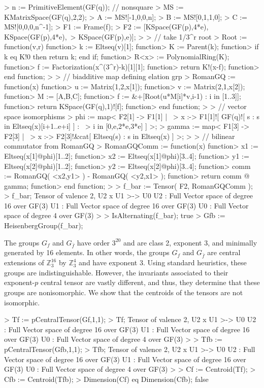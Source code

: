 \begin{example}
\begin{code}
> n := PrimitiveElement(GF(q)); // nonsquare
> MS := KMatrixSpace(GF(q),2,2);
> A := MS![-1,0,0,n];
> B := MS![0,1,1,0];
> C := MS![0,0,0,n^-1];
> F1 := Frame(f);
> F2 := [KSpace(GF(p),4*e), KSpace(GF(p),4*e),\
>   KSpace(GF(p),e)];
> 
> // take 1/3^r root
> Root := function(v,r) 
function>   k := Eltseq(v)[1];
function>   K := Parent(k);
function>   if k eq K!0 then return k; end if;
function>   R<x> := PolynomialRing(K);
function>   f := Factorization(x^(3^r)-k)[1][1];
function>   return K!(x-f);
function> end function;
> 
> // biadditive map defining elation grp
> RomanGQ := function(x) 
function>   u := Matrix(1,2,x[1]);
function>   v := Matrix(2,1,x[2]);
function>   M := [A,B,C];
function>   f := &+[Root(u*M[i]*v,i-1) : i in [1..3]];
function>   return KSpace(GF(q),1)![f];
function> end function;
> 
> // vector space isomorphisms
> phi := map< F2[1] -> F1[1] | \
>   x :-> F1[1]![ GF(q)![ s : s in Eltseq(x)[i+1..e+i] ] : \
>     i in [0,e,2*e,3*e] ] >;
> gamma := map< F1[3] -> F2[3] | \
>   x :-> F2[3]!&cat[ Eltseq(s) : s in Eltseq(x) ] >;
> 
> // bilinear commutator from RomanGQ
> RomanGQComm := function(x)
function>   x1 := Eltseq(x[1]@phi)[1..2];
function>   x2 := Eltseq(x[1]@phi)[3..4];
function>   y1 := Eltseq(x[2]@phi)[1..2];
function>   y2 := Eltseq(x[2]@phi)[3..4];
function>   comm := RomanGQ( <x2,y1> ) - RomanGQ( <y2,x1> );
function>   return comm @ gamma;
function> end function;
> 
> f_bar := Tensor( F2, RomanGQComm );
> f_bar;
Tensor of valence 2, U2 x U1 >-> U0
U2 : Full Vector space of degree 16 over GF(3)
U1 : Full Vector space of degree 16 over GF(3)
U0 : Full Vector space of degree 4 over GF(3)
> 
> IsAlternating(f_bar);
true
> Gfb := HeisenbergGroup(f_bar);
\end{code}

The groups $G_f$ and $G_{\bar{f}}$ have order $3^{20}$ and are class 2, exponent 3, and minimally generated by 16 elements.
In other words, the groups $G_f$ and $G_{\bar{f}}$ are central extensions of $\mathbb{Z}_3^{16}$ by $\mathbb{Z}_3^{4}$ and have exponent $3$.
Using standard heuristics, these groups are indistinguishable.
However, the invariants associated to their exponent-$p$ central tensor are vastly different, 
and thus, they determine that these groups are nonisomorphic. 
We show that the centroids of the tensors are not isomorphic.

\begin{code}
> Tf := pCentralTensor(Gf,1,1);
> Tf;
Tensor of valence 2, U2 x U1 >-> U0
U2 : Full Vector space of degree 16 over GF(3)
U1 : Full Vector space of degree 16 over GF(3)
U0 : Full Vector space of degree 4 over GF(3)
> 
> Tfb := pCentralTensor(Gfb,1,1);
> Tfb;
Tensor of valence 2, U2 x U1 >-> U0
U2 : Full Vector space of degree 16 over GF(3)
U1 : Full Vector space of degree 16 over GF(3)
U0 : Full Vector space of degree 4 over GF(3)
> 
> Cf := Centroid(Tf);
> Cfb := Centroid(Tfb);
> Dimension(Cf) eq Dimension(Cfb);
false
\end{code}
\end{example}

